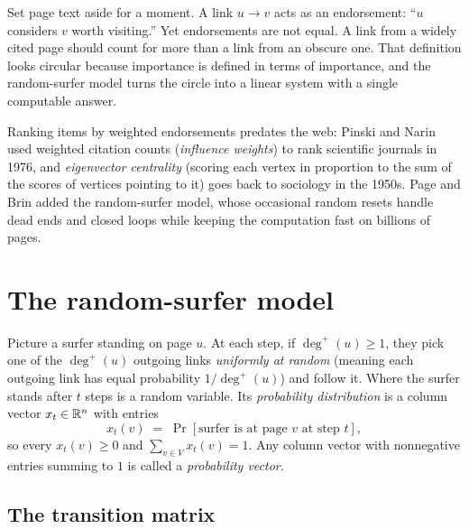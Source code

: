 \begin{intuitionbox}
Set page text aside for a moment. A link $u \to v$ acts as an endorsement: ``$u$ considers $v$ worth visiting.'' Yet endorsements are not equal. A link from a widely cited page should count for more than a link from an obscure one. That definition looks circular because importance is defined in terms of importance, and the random-surfer model turns the circle into a linear system with a single computable answer.
\end{intuitionbox}

Ranking items by weighted endorsements predates the web: Pinski and Narin used weighted citation counts (\emph{influence weights}) to rank scientific journals in 1976, and \emph{eigenvector centrality} (scoring each vertex in proportion to the sum of the scores of vertices pointing to it) goes back to sociology in the 1950s. Page and Brin added the random-surfer model, whose occasional random resets handle dead ends and closed loops while keeping the computation fast on billions of pages.

\section{The random-surfer model}
\label{ch36:surfer}

Picture a surfer standing on page $u$. At each step, if $\deg^+(u) \ge 1$, they pick one of the $\deg^+(u)$ outgoing links \emph{uniformly at random} (meaning each outgoing link has equal probability $1/\deg^+(u)$) and follow it. Where the surfer stands after $t$ steps is a random variable. Its \emph{probability distribution} is a column vector $x_t \in \mathbb{R}^n$ with entries
\[
  x_t(v) \;=\; \Pr[\text{surfer is at page } v \text{ at step } t],
\]
so every $x_t(v) \ge 0$ and $\sum_{v \in V} x_t(v) = 1$. Any column vector with nonnegative entries summing to $1$ is called a \emph{probability vector}.

\subsection{The transition matrix}

